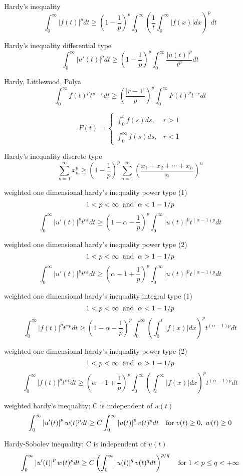 Hardy's inequality
$$
\int^\infty_0|f(t)|^p dt \ge\left(1-\frac{1}{p}\right)^p\int^\infty_0\left(\frac{1}{t}\int^\infty_0|f(x)|dx\right)^p dt
$$

Hardy's inequality differential type
$$
\int^\infty_0|u'(t)|^p dt \ge \left(1-\frac{1}{p}\right)^p\int^\infty_0\frac{|u(t)|^p}{t^p}dt
$$

Hardy, Littlewood, Polya
$$
\int^\infty_0f(t)^pt^{p-r} dt\ge \left(\frac{|r-1|}{p}\right)^p\int^\infty_0F(t)^pt^{-r}dt
$$

$$
F(t)=
\left\{
\begin{array}{ll}
\int^t_0 f(s)ds, & r>1 \\
\\
\int^\infty_0 f(s)ds, & r<1
\end{array}
\right.
$$

Hardy's inequality discrete type
$$
\sum^\infty_{n=1} x^p_n \ge \left(1-\frac{1}{p}\right)^p\sum^\infty_{n=1}\left(\frac{x_1+x_2+\cdots+x_n}{n}\right)^n
$$

weighted one dimensional hardy's inequality power type (1)
$$
1< p <\infty \;\; {\rm and} \;\; \alpha< 1-1/p
$$
$$
\int^\infty_0\left |u'(t)\right|^p t^{\alpha t}dt \ge \left(1-\alpha-\frac{1}{p}\right)^p\int^\infty_0 \left |u(t)\right|^p t^{(\alpha-1)p}dt
$$

weighted one dimensional hardy's inequality power type (2)
$$
1< p <\infty \;\; {\rm and} \;\; \alpha> 1-1/p
$$
$$
\int^\infty_0\left |u'(t)\right|^p t^{\alpha t}dt \ge \left(\alpha-1+\frac{1}{p}\right)^p\int^\infty_0 \left |u(t)\right|^p t^{(\alpha-1)p}dt
$$

weighted one dimensional hardy's inequality integral type (1)
$$
1< p <\infty \;\; {\rm and} \;\; \alpha< 1-1/p
$$
$$
\int^\infty_0\left |f(t)\right|^p t^{\alpha p}dt \ge \left(1-\alpha-\frac{1}{p}\right)^p\int^\infty_0\left(\int_0^t \left |f(x)\right|dx\right)^p t^{(\alpha-1)p}dt
$$

weighted one dimensional hardy's inequality power type (2)
$$
1< p <\infty \;\; {\rm and} \;\; \alpha> 1-1/p
$$
$$
\int^\infty_0\left |f(t)\right|^p t^{\alpha t}dt \ge \left(\alpha-1+\frac{1}{p}\right)^p\int^\infty_0\left(\int^\infty_t\left|f(x)\right|dx\right)^p t^{(\alpha-1)p}dt
$$

weighted hardy's inequality; C is independent of $u(t)$
$$
\int^\infty_0\left|u'(t)\right|^p w(t)^pdt \ge C \int^\infty_0\left|u(t)\right|^p v(t)^p dt \quad {\rm for} \; v(t)\ge 0,\;w(t)\ge 0
$$

Hardy-Sobolev inequality; C is independent of $u(t)$
$$
\int^\infty_0\left|u'(t)\right|^p w(t)^pdt \ge C \left(\int^\infty_0\left|u(t)\right|^q v(t)^q dt \right)^{p/q} \quad {\rm for} \; 1 < p \le q < +\infty
$$

